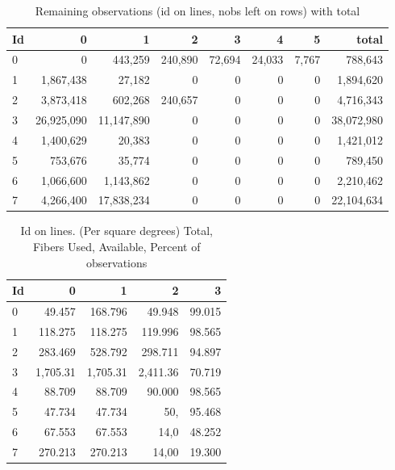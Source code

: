 \documentclass[10pt]{extarticle}
\begin{document}
\begin{multicols}{2}
\begin{table}[H]\begin{center}
\caption{Remaining observations (id on lines, nobs left on rows) with total}\label{tab:full14k}
\begin{tabular}{l|rrrrrrr}
	Id &      0  &           1  &           2  &           3  &           4  &           5  & total\\ \hline
   0  &           0  &     443,259  &     240,890  &      72,694  &      24,033  &       7,767  &     788,643\\
   1  &   1,867,438  &      27,182  &           0  &           0  &           0  &           0  &   1,894,620\\
   2  &   3,873,418  &     602,268  &     240,657  &           0  &           0  &           0  &   4,716,343\\
   3  &  26,925,090  &  11,147,890  &           0  &           0  &           0  &           0  &  38,072,980\\
   4  &   1,400,629  &      20,383  &           0  &           0  &           0  &           0  &   1,421,012\\
   5  &     753,676  &      35,774  &           0  &           0  &           0  &           0  &     789,450\\
   6  &   1,066,600  &   1,143,862  &           0  &           0  &           0  &           0  &   2,210,462\\
   7  &   4,266,400  &  17,838,234  &           0  &           0  &           0  &           0  &  22,104,634\\
\end{tabular}\end{center}
 \end{table}

\begin{table}[H]\begin{center}
\caption{Id on lines. (Per square degrees) Total, Fibers Used, Available, Percent of observations}
\begin{tabular}{l|rrrr} 
   Id &          0  &           1  &           2  &           3 \\ \hline
   0  &      49.457  &     168.796  &      49.948  &      99.015   \\
   1  &     118.275  &     118.275  &     119.996  &      98.565   \\
   2  &     283.469  &     528.792  &     298.711  &      94.897   \\
   3  &    1,705.31  &    1,705.31  &    2,411.36  &      70.719   \\
   4  &      88.709  &      88.709  &      90.000  &      98.565   \\
   5  &      47.734  &      47.734  &         50,  &      95.468   \\
   6  &      67.553  &      67.553  &        14,0  &      48.252   \\
   7  &     270.213  &     270.213  &       14,00  &      19.300   \\
\end{tabular}\end{center}
 \end{table}


\end{multicols}
\end{document}
